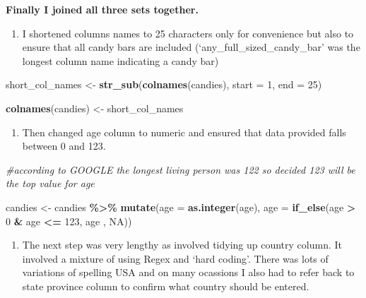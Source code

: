 \documentclass[
]{article}
\newenvironment{Shaded}{\begin{snugshade}}{\end{snugshade}}
\newcommand{\AttributeTok}[1]{\textcolor[rgb]{0.13,0.29,0.53}{#1}}
\newcommand{\CommentTok}[1]{\textcolor[rgb]{0.56,0.35,0.01}{\textit{#1}}}
\newcommand{\ConstantTok}[1]{\textcolor[rgb]{0.56,0.35,0.01}{#1}}
\newcommand{\DecValTok}[1]{\textcolor[rgb]{0.00,0.00,0.81}{#1}}
\newcommand{\FunctionTok}[1]{\textcolor[rgb]{0.13,0.29,0.53}{\textbf{#1}}}
\newcommand{\NormalTok}[1]{#1}
\newcommand{\OtherTok}[1]{\textcolor[rgb]{0.56,0.35,0.01}{#1}}
\newcommand{\SpecialCharTok}[1]{\textcolor[rgb]{0.81,0.36,0.00}{\textbf{#1}}}
\providecommand{\tightlist}{%
  \setlength{\itemsep}{0pt}\setlength{\parskip}{0pt}}
\begin{document}
\textbf{Finally I joined all three sets together.}

\begin{enumerate}
\def\labelenumi{\arabic{enumi}.}
\tightlist
\item
  I shortened columns names to 25 characters only for convenience but
  also to ensure that all candy bars are included
  (`any\_full\_sized\_candy\_bar' was the longest column name indicating
  a candy bar)
\end{enumerate}

\begin{Shaded}
\begin{Highlighting}[]
\NormalTok{short\_col\_names }\OtherTok{\textless{}{-}} \FunctionTok{str\_sub}\NormalTok{(}\FunctionTok{colnames}\NormalTok{(candies), }\AttributeTok{start =} \DecValTok{1}\NormalTok{, }\AttributeTok{end =} \DecValTok{25}\NormalTok{)}

\FunctionTok{colnames}\NormalTok{(candies) }\OtherTok{\textless{}{-}}\NormalTok{ short\_col\_names}
\end{Highlighting}
\end{Shaded}

\begin{enumerate}
\def\labelenumi{\arabic{enumi}.}
\setcounter{enumi}{1}
\tightlist
\item
  Then changed age column to numeric and ensured that data provided
  falls between 0 and 123.
\end{enumerate}

\begin{Shaded}
\begin{Highlighting}[]
\CommentTok{\#according to GOOGLE the longest living person was 122 so decided 123 will be the top value for age}

\NormalTok{candies }\OtherTok{\textless{}{-}}\NormalTok{ candies }\SpecialCharTok{\%\textgreater{}\%} 
  \FunctionTok{mutate}\NormalTok{(}\AttributeTok{age =} \FunctionTok{as.integer}\NormalTok{(age),}
         \AttributeTok{age =} \FunctionTok{if\_else}\NormalTok{(age }\SpecialCharTok{\textgreater{}} \DecValTok{0} \SpecialCharTok{\&}\NormalTok{ age }\SpecialCharTok{\textless{}=} \DecValTok{123}\NormalTok{, age , }\ConstantTok{NA}\NormalTok{))}
\end{Highlighting}
\end{Shaded}

\begin{enumerate}
\def\labelenumi{\arabic{enumi}.}
\setcounter{enumi}{2}
\tightlist
\item
  The next step was very lengthy as involved tidying up country column.
  It involved a mixture of using Regex and `hard coding'. There was lots
  of variations of spelling USA and on many ocassions I also had to
  refer back to state province column to confirm what country should be
  entered.
\end{enumerate}
\end{document}
